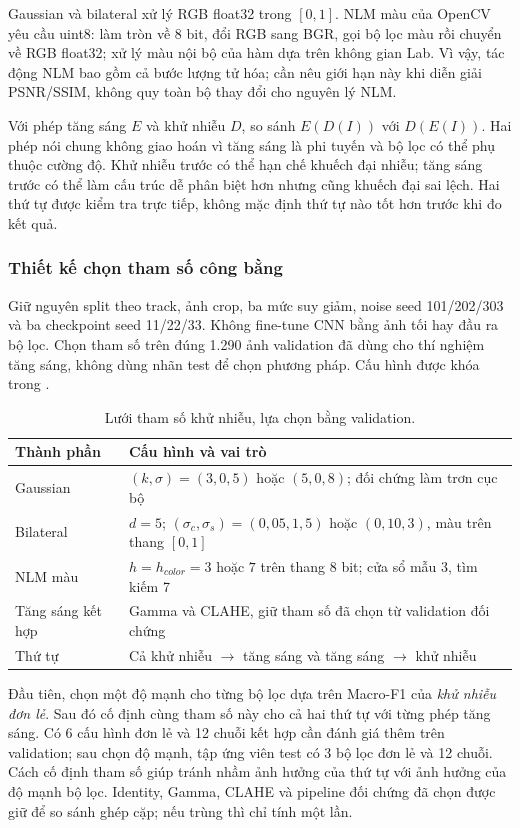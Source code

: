 Gaussian và bilateral xử lý RGB float32 trong $[0,1]$. NLM màu của OpenCV yêu cầu uint8: làm tròn về 8 bit, đổi RGB sang BGR, gọi bộ lọc màu rồi chuyển về RGB float32; xử lý màu nội bộ của hàm dựa trên không gian Lab. Vì vậy, tác động NLM bao gồm cả bước lượng tử hóa; cần nêu giới hạn này khi diễn giải PSNR/SSIM, không quy toàn bộ thay đổi cho nguyên lý NLM.

Với phép tăng sáng $E$ và khử nhiễu $D$, so sánh $E(D(I))$ với $D(E(I))$. Hai phép nói chung không giao hoán vì tăng sáng là phi tuyến và bộ lọc có thể phụ thuộc cường độ. Khử nhiễu trước có thể hạn chế khuếch đại nhiễu; tăng sáng trước có thể làm cấu trúc dễ phân biệt hơn nhưng cũng khuếch đại sai lệch. Hai thứ tự được kiểm tra trực tiếp, không mặc định thứ tự nào tốt hơn trước khi đo kết quả.

\subsubsection{Thiết kế chọn tham số công bằng}
Giữ nguyên split theo track, ảnh crop, ba mức suy giảm, noise seed 101/202/303 và ba checkpoint seed 11/22/33. Không fine-tune CNN bằng ảnh tối hay đầu ra bộ lọc. Chọn tham số trên đúng 1.290 ảnh validation đã dùng cho thí nghiệm tăng sáng, không dùng nhãn test để chọn phương pháp. Cấu hình được khóa trong .

\begin{table}[!htbp]
\centering\small
\caption{Lưới tham số khử nhiễu, lựa chọn bằng validation.}
\begin{tabular}{P{3.0cm}P{10.5cm}}
\toprule
Thành phần & Cấu hình và vai trò \\
\midrule
Gaussian & $(k,\sigma)=(3,0{,}5)$ hoặc $(5,0{,}8)$; đối chứng làm trơn cục bộ \\
Bilateral & $d=5$; $(\sigma_c,\sigma_s)=(0{,}05,1{,}5)$ hoặc $(0{,}10,3)$, màu trên thang $[0,1]$ \\
NLM màu & $h=h_{color}=3$ hoặc $7$ trên thang 8 bit; cửa sổ mẫu 3, tìm kiếm 7 \\
Tăng sáng kết hợp & Gamma và CLAHE, giữ tham số đã chọn từ validation đối chứng \\
Thứ tự & Cả khử nhiễu $\to$ tăng sáng và tăng sáng $\to$ khử nhiễu \\
\bottomrule
\end{tabular}
\end{table}

Đầu tiên, chọn một độ mạnh cho từng bộ lọc dựa trên Macro-F1 của \textit{khử nhiễu đơn lẻ}. Sau đó cố định cùng tham số này cho cả hai thứ tự với từng phép tăng sáng. Có 6 cấu hình đơn lẻ và 12 chuỗi kết hợp cần đánh giá thêm trên validation; sau chọn độ mạnh, tập ứng viên test có 3 bộ lọc đơn lẻ và 12 chuỗi. Cách cố định tham số giúp tránh nhầm ảnh hưởng của thứ tự với ảnh hưởng của độ mạnh bộ lọc. Identity, Gamma, CLAHE và pipeline đối chứng đã chọn được giữ để so sánh ghép cặp; nếu trùng thì chỉ tính một lần.


